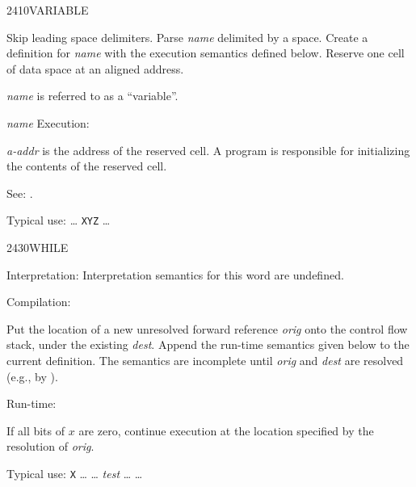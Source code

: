 \begin{newword}{2410}{VARIABLE}

	Skip leading space delimiters. Parse \emph{name} delimited by
	a space. Create a definition for \emph{name} with the execution
	semantics defined below. Reserve one cell of data space at an
	aligned address.

	\emph{name} is referred to as a ``variable''.

\item[\emph{name} Execution:]

	\emph{a-addr} is the address of the reserved cell. A program
	is responsible for initializing the contents of the reserved
	cell.

\item[See:]
	.

	\begin{rationale} %
		Typical use:
			{\ldots}  \texttt{XYZ} {\ldots}
	\end{rationale}
\end{newword}


\begin{newword*}{2430}{WHILE}
\item[Interpretation:]
	Interpretation semantics for this word are undefined.

\item[Compilation:]

	Put the location of a new unresolved forward reference
	\emph{orig} onto the control flow stack, under the existing
	\emph{dest}. Append the run-time semantics given below to the
	current definition. The semantics are incomplete until
	\emph{orig} and \emph{dest} are resolved (e.g., by
	).

\item[Run-time:]

	If all bits of $x$ are zero, continue execution at the location
	specified by the resolution of \emph{orig}.

	\begin{rationale} %
		Typical use:
			\word{:} \texttt{X} {\ldots}
				 {\ldots}
				\emph{test} 
				{\ldots} 
			{\ldots} \word{;}
	\end{rationale}
\end{newword*}


